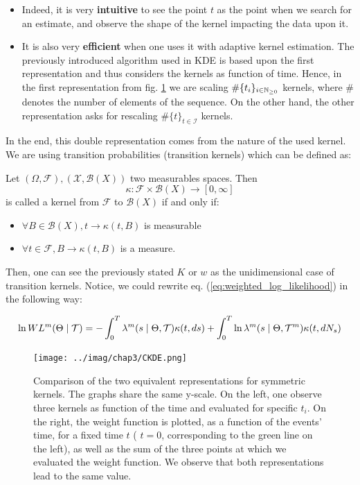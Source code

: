 \documentclass[11pt]{book}
\newcommand{\sequence}[1]{\{ #1 \}_{ i \in \N} }
\newcommand{\sequencetime}{\{t\}_{t \in \mathcal I} }
\begin{document}
\begin{itemize}
\item Indeed, it is very \textbf{intuitive} to see the point $t$ as the point when we search for an estimate, and observe the shape of the kernel impacting the data upon it. 
\item It is also very \textbf{efficient} when one uses it with adaptive kernel estimation. The previously introduced algorithm used in KDE is based upon the first representation and thus considers the kernels as function of time. Hence, in the first representation from fig. \ref{fig:CKDE} we are scaling $\# \sequence{t_i}$ kernels, where $\#$ denotes the number of elements of the sequence. On the other hand, the other representation asks for rescaling $\#\sequencetime$ kernels. 
\end{itemize}


In the end, this double representation comes from the nature of the used kernel. We are using transition probabilities (transition kernels) which can be defined as:

\begin{definition}
Let $(\Omega, \mathcal F), ( \mathcal X, \mathcal B (X) )$ two measurables spaces. Then $$ \kappa : \mathcal F \times \mathcal B (X) \to [0, \infty] $$ is called a kernel from $\mathcal F$ to $\mathcal B(X)$ if and only if:

\begin{itemize}
\setlength{\itemindent}{3. cm}
\item $\forall B \in \mathcal B(X), t \to \kappa(  t, B)$ is measurable
\item $\forall t \in \mathcal F, B \to \kappa(  t, B)$ is a measure.
\end{itemize}
\end{definition}

Then, one can see the previously stated $K$ or $w$ as the unidimensional case of transition kernels. Notice, we could rewrite eq. (\ref{eq:weighted_log_likelihood}) in the following way:

$$ \ln W L^m( \Theta \mid \mathcal{T} ) = - \int_0^T \lambda^{m} ( s \mid \Theta , \mathcal{T} ) \kappa(t, ds) + \int_0^T \ln \lambda^{m} ( s \mid \Theta , \mathcal{T}^m ) \kappa(t, d N_s)  $$

\begin{figure}
\centering
\texttt{[image: ../imag/chap3/CKDE.png]}
\caption{Comparison of the two equivalent representations for symmetric kernels. The graphs share the same y-scale. On the left, one observe three kernels as function of the time and evaluated for specific $t_i$. On the right, the weight function is plotted, as a function of the events' time, for a fixed time $t$ ( $t= 0$, corresponding to the green line on the left), as well as the sum of the three points at which we evaluated the weight function. We observe that both representations lead to the same value.}
\label{fig:CKDE}
\end{figure}
\end{document}
